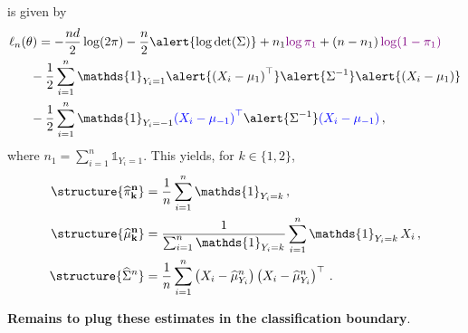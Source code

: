 \documentclass[xcolor={usenames,dvipsnames},handout]{beamer}
\begin{document}
\begin{frame}
 is given by
\begin{align*}
\ell_n(\theta) &= - \frac{nd}{2} \log(2\pi)-\frac{n}2 \alert{\log\mathrm{\det}(\Sigma)} + n_1\textcolor{violet}{\log \pi_1} + \left(n-n_1\right)\textcolor{violet}{\log (1-\pi_{1})} \\
& \hspace{-.21cm}
-  \frac{1}{2}\sum_{i=1}^n\mathds{1}_{Y_i=1}\alert{\left(X_i - \mu_{1}\right)^\top}\alert{\Sigma^{-1}}\alert{\left(X_i - \mu_{1}\right)}\\
& \hspace{-.21cm} -  \frac{1}{2}\sum_{i=1}^n\mathds{1}_{Y_i=-1}\textcolor{blue}{\left(X_i - \mu_{-1}\right)^\top}\alert{\Sigma^{-1}}\textcolor{blue}{\left(X_i - \mu_{-1}\right)}\,,
\end{align*}
where $n_1 = \sum_{i=1}^n\mathds{1}_{Y_i=1}$. This yields, for $k\in\{1,2\}$,  
\begin{align*}
\structure{{\bf \widehat \pi_k^n}} &= \frac{1}{n}\sum_{i=1}^n\mathds{1}_{Y_i=k}\,,\\
\structure{{\bf \widehat \mu_k^n}} &= \frac{1}{\sum_{i=1}^n\mathds{1}_{Y_i=k}}\sum_{i=1}^n\mathds{1}_{Y_i=k}\,X_i\,,\\
\structure{{\widehat\Sigma^n}} &= \frac{1}{n}\sum_{i=1}^n \left(X_i - \widehat \mu_{Y_i}^n\right)\left(X_i - \widehat \mu_{Y_i}^n\right)^\top\,.
\end{align*}

\alert{{\bf Remains to plug these estimates in the classification boundary}}.
\end{frame}
\end{document}
